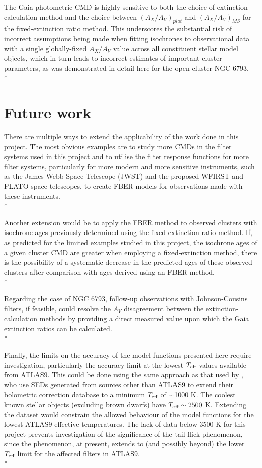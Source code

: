 \documentclass[12pt, a4paper]{report}
\begin{document}
The Gaia photometric CMD is highly sensitive to both the choice of extinction-calculation method and the choice between $(A_{X}/A_{V})_{plat}$ and $(A_{X}/A_{V})_{MS}$ for the fixed-extinction ratio method. This underscores the substantial risk of incorrect assumptions being made when fitting isochrones to observational data with a single globally-fixed $A_{X}/A_{V}$ value across all constituent stellar model objects, which in turn leads to incorrect estimates of important cluster parameters, as was demonstrated in detail here for the open cluster NGC 6793. \\*

\section{Future work}
There are multiple ways to extend the applicability of the work done in this project. The most obvious examples are to study more CMDs in the filter systems used in this project and to utilise the filter response functions for more filter systems, particularly for more modern and more sensitive instruments, such as the James Webb Space Telescope (JWST) and the proposed WFIRST and PLATO space telescopes, to create FBER models for observations made with these instruments.\\*

Another extension would be to apply the FBER method to observed clusters with isochrone ages previously determined using the fixed-extinction ratio method. If, as predicted for the limited examples studied in this project, the isochrone ages of a given cluster CMD are greater when employing a fixed-extinction method, there is the possibility of a systematic decrease in the predicted ages of these observed clusters after comparison with ages derived using an FBER method.\\*

Regarding the case of NGC 6793, follow-up observations with Johnson-Cousins filters, if feasible, could resolve the $A_{V}$ disagreement between the extinction-calculation methods by providing a direct measured value upon which the Gaia extinction ratios can be calculated.\\*

Finally, the limits on the accuracy of the model functions presented here require investigation, particularly the accuracy limit at the lowest $T_{\textnormal{eff}}$ values available from ATLAS9. This could be done using the same approach as that used by \cite{2008PASP..120..583G}, who use SEDs generated from sources other than ATLAS9 to extend their bolometric correction database to a minimum $T_{\textnormal{eff}}$ of $\sim$1000 K. The coolest known stellar objects (excluding brown dwarfs) have $T_{\textnormal{eff}} \sim 2500$ K. Extending the dataset would constrain the allowed behaviour of the model functions for the lowest ATLAS9 effective temperatures. The lack of data below 3500 K for this project prevents investigation of the significance of the tail-flick phenomenon, since the phenomenon, at present, extends to (and possibly beyond) the lower $T_{\textnormal{eff}}$ limit for the affected filters in ATLAS9.\\*

%

\end{document}
